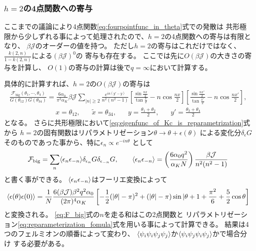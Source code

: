 \subsubsection{$h = 2$の4点関数への寄与}
ここまでの議論により4点関数\eqref{eq:fourpointfunc_in_theta}式での発散は
共形極限から少しずれる事によって処理されたので、$h=2$の4点関数への寄与は有限となり、
$\beta\mathcal{J}$のオーダーの値を持つ。
ただし$h=2$の寄与はこれだけではなく、$\frac{k(2,n)}{1-k(2,n)}$による$(\beta\mathcal{J})^0$の
寄与も存在する。
ここでは先に$O(\beta\mathcal{J})$の大きさの寄与を計算し、
$O(1)$の寄与の計算は後で$q=\infty$において計算する。

具体的に計算すれば、$h=2$の$O(\beta\mathcal{J})$の寄与は
\begin{align}
	\frac{\mathcal{F}_{\mathrm{big}}(\theta_1,\cdots,\theta_4)}{G(\theta_{12})G(\theta_{34})}
	= \frac{6\alpha_0}{\pi^2\alpha_K}\beta\mathcal{J}\sum_{|n|\geq 2}
		\frac{e^{in(y' - y)}}{n^2(n^2 - 1)}
		\left[
			\frac{\sin\frac{nx}{2}}{\tan\frac{x}{2}} - n\cos\frac{nx}{2}
		\right]
		\left[
			\frac{\sin\frac{nx'}{2}}{\tan\frac{x'}{2}} - n\cos\frac{nx'}{2}
		\right],
	\label{eq:F_big}
\end{align}
\begin{align}
	x = \theta_{12},\hspace{20pt}
	\tilde{x} = \theta_{34},\hspace{20pt}
	y = \frac{\theta_1 + \theta_2}{2},\hspace{20pt}
	y' = \frac{\theta_3 + \theta_4}{2}
\end{align}
となる。
さらに共形極限において\eqref{eq:eigenfunc_of_Kc_is_reparametrization}式から
$h=2$の固有関数はリパラメトリゼーション$\theta\to\theta + \epsilon(\theta)$
による変化分$\delta_{\epsilon}G$そのものであった事から、特に$\epsilon_n \propto e^{-in\theta}$
として
\begin{align}
	\mathcal{F}_{\mathrm{big}} = 
	\sum_n \langle \epsilon_n\epsilon_{-n} \rangle\delta_{\epsilon_n}G\delta_{\epsilon_{-n}}G,
	\hspace{20pt}
	\langle \epsilon_n\epsilon_{-n} \rangle = 
	\left(\frac{6\alpha_0q^2}{\alpha_K N}\right)\frac{\beta\mathcal{J}}{n^2(n^2-1)}
\end{align}
と書く事ができる。
$\langle \epsilon_n\epsilon_{-n} \rangle$はフーリエ変換によって
\begin{align}
	\langle \epsilon(\theta)\epsilon(0) \rangle
	= \frac{1}{N}\frac{6(\beta\mathcal{J}) \beta^2 q^2 \alpha_0}{(2\pi)^4 \alpha_K}
	\left[
		-\frac{1}{2}(|\theta| - \pi)^2 + (|\theta| - \pi)\sin|\theta
		+ 1 + \frac{\pi^2}{6} + \frac{5}{2}\cos\theta
	\right]
	\label{eq:propagator_of_epsilon}
\end{align}
と変換される。
\eqref{eq:F_big}式の$n$を走る和はこの2点関数と
リパラメトリゼーション\eqref{eq:reparameterization_fomula}式を用いる事によって計算できる。
結果は4つのフェルミオンの順番によって変わり、
$\langle \psi_i\psi_i\psi_j\psi_j \rangle$か$\langle \psi_i\psi_j\psi_i\psi_j \rangle$かで場合分け
する必要がある。

